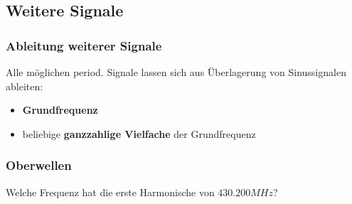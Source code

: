 \subsection{Weitere Signale}

\begin{frame}
    \frametitle{Ableitung weiterer Signale}

    Alle möglichen period. Signale lassen sich aus Überlagerung von
    Sinussignalen ableiten:

    \begin{itemize}
        \item \textbf{Grundfrequenz}
        \item beliebige \textbf{ganzzahlige Vielfache} der Grundfrequenz
    \end{itemize}

\end{frame}

\begin{frame}
\frametitle{Oberwellen}

    \begin{block}{Welche Frequenz hat die erste Harmonische von $430.200 MHz$?}
    \end{block}


\end{frame}

